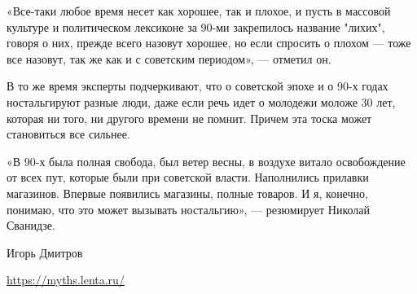 «Все-таки любое время несет как хорошее, так и плохое, и пусть в массовой
культуре и политическом лексиконе за 90-ми закрепилось название "лихих", говоря
о них, прежде всего назовут хорошее, но если спросить о плохом --- тоже все
назовут, так же как и с советским периодом», --- отметил он.

В то же время эксперты подчеркивают, что о советской эпохе и о 90-х годах
ностальгируют разные люди, даже если речь идет о молодежи моложе 30 лет,
которая ни того, ни другого времени не помнит. Причем эта тоска может
становиться все сильнее.

«В 90-х была полная свобода, был ветер весны, в воздухе витало освобождение от
всех пут, которые были при советской власти. Наполнились прилавки магазинов.
Впервые появились магазины, полные товаров. И я, конечно, понимаю, что это
может вызывать ностальгию», --- резюмирует Николай Сванидзе.

Игорь Дмитров

\url{https://myths.lenta.ru/}
